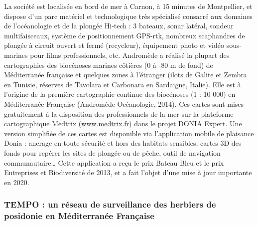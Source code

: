 La société est localisée en bord de mer à Carnon, à 15 minutes de Montpellier, et dispose d’un parc matériel et technologique très spécialisé consacré aux domaines de l'océanologie et de la plongée Hi-tech : 3 bateaux, sonar latéral, sondeur multifaisceaux, système de positionnement GPS-rtk, nombreux scaphandres de plongée à circuit ouvert et fermé (recycleur), équipement photo et vidéo sous-marines pour films professionnels, etc. Andromède a réalisé la plupart des cartographies des biocénoses marines côtières (0 à -80 m de fond) de Méditerranée française et quelques zones à l’étranger (ilots de Galite et Zembra en Tunisie, réserves de Tavolara et Carbonara en Sardaigne, Italie). Elle est à l’origine de la première cartographie continue des biocénoses (1 : 10 000) en Méditerranée Française (Andromède Océanologie, 2014). Ces cartes sont mises gratuitement à la disposition des professionnels de la mer sur la plateforme cartographique Medtrix (\href{www.medtrix.fr}{www.medtrix.fr}) dans le projet DONIA Expert. Une version simplifiée de ces cartes est disponible via l’application mobile de plaisance Donia : ancrage en toute sécurité et hors des habitats sensibles, cartes 3D des fonds pour repérer les sites de plongée ou de pêche, outil de navigation communautaire… Cette application a reçu le prix Bateau Bleu et le prix Entreprises et Biodiversité de 2013, et a fait l’objet d’une mise à jour importante en 2020.

\subsubsection{TEMPO : un réseau de surveillance des herbiers de posidonie en Méditerranée Française}\label{intro.2.3.2}

